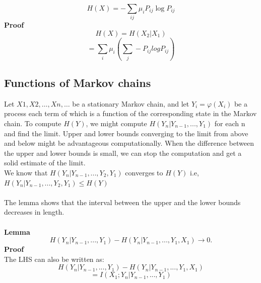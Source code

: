 \documentclass[10pt,twocolumn,letterpaper]{article}
\begin{document}
\begin{equation*}
    H(X) = -\sum_{ij}\mu_i P_{ij} \log{P_{ij}}
\end{equation*}
\textbf{Proof}
\begin{equation*}
    H ( X ) = H (X_2 |X_1 ) 
\end{equation*}
\begin{equation*}
   = \sum_i \mu_i(\sum_j -P_{ij}logP_{ij})
\end{equation*}
\subsection{Functions of Markov chains}
Let $ X 1 , X 2 , \dots , X n , \dots $ be a stationary Markov chain, and let $ Y_i = \varphi (X_i)$ be a process each term of which is a function of the corresponding state in the Markov chain. To compute $H ( Y )$, we might compute $H (Y_n |Y_{n-1} , . . . , Y_1 )$ for each n and ﬁnd the limit.
Upper and lower bounds converging to the limit from above and below might be advantageous computationally. When the difference between the upper and lower bounds is small, we can stop the computation and get a solid estimate of the limit.\\ We know that  \begin{math}  H (Y_n |Y_{n-1} , . . . , Y_2 , Y_1 )  \end{math} converges to \begin{math} H(Y) \end{math} i.e, \begin{math} H (Y_n |Y_{n-1} , . . . , Y_2 , Y_1 )  \leq H(Y) \end{math}\\
\\The lemma shows that the interval between the upper and the lower bounds decreases in length.\\
\\ \textbf{Lemma}\\
\begin{equation*}
    H (Y_n |Y_{n-1} , . . . , Y_1 ) - H (Y_n |Y_{n-1} , . . . , Y_1 , X_1 ) \to 0.
\end{equation*}
\textbf{Proof}
\\The LHS can also be written as:
\begin{equation*}
     H (Y_n |Y_{n-1} , . . . , Y_1 ) - H (Y_n |Y_{n-1} , . . . , Y_1 , X_1 )
\end{equation*}
\begin{equation*}
    = I (X_1 ; Y_n |Y_{n-1}, . . . , Y_1 )
\end{equation*}
\end{document}
